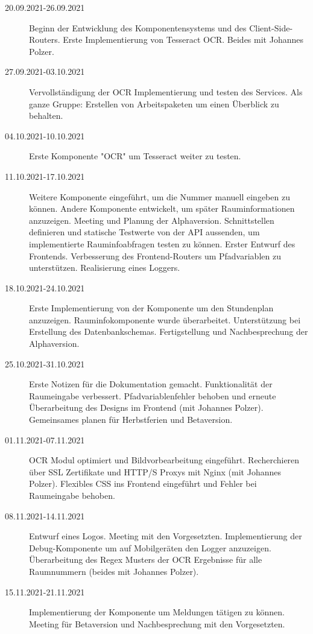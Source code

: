 
\begin{description}
    \item[20.09.2021-26.09.2021]Beginn der Entwicklung des Komponentensystems und des Client-Side-Routers. Erste Implementierung von Tesseract OCR. Beides mit Johannes Polzer.
    \item[27.09.2021-03.10.2021] Vervollständigung der OCR Implementierung und testen des Services. Als ganze Gruppe: Erstellen von Arbeitspaketen um einen Überblick zu behalten.
    \item[04.10.2021-10.10.2021] Erste Komponente "OCR" um Tesseract weiter zu testen.
    \item[11.10.2021-17.10.2021] Weitere Komponente eingeführt, um die Nummer manuell eingeben zu können. Andere Komponente entwickelt, um später Rauminformationen anzuzeigen. Meeting und Planung der Alphaversion. Schnittstellen definieren und statische Testwerte von der API aussenden, um implementierte Rauminfoabfragen testen zu können. Erster Entwurf des Frontends. Verbesserung des Frontend-Routers um Pfadvariablen zu unterstützen. Realisierung eines Loggers.
    \item[18.10.2021-24.10.2021] Erste Implementierung von der Komponente um den Stundenplan anzuzeigen. Rauminfokomponente wurde überarbeitet. Unterstützung bei Erstellung des Datenbankschemas. Fertigstellung und Nachbesprechung der Alphaversion.
    \item[25.10.2021-31.10.2021] Erste Notizen für die Dokumentation gemacht. Funktionalität der Raumeingabe verbessert. Pfadvariablenfehler behoben und erneute Überarbeitung des Designs im Frontend (mit Johannes Polzer). Gemeinsames planen für Herbstferien und Betaversion.
    \item[01.11.2021-07.11.2021] OCR Modul optimiert und Bildvorbearbeitung eingeführt. Recherchieren über SSL Zertifikate und HTTP/S Proxys mit Nginx (mit Johannes Polzer). Flexibles CSS ins Frontend eingeführt und Fehler bei Raumeingabe behoben.
    \item[08.11.2021-14.11.2021] Entwurf eines Logos. Meeting mit den Vorgesetzten. Implementierung der Debug-Komponente um auf Mobilgeräten den Logger anzuzeigen. Überarbeitung des Regex Musters der OCR Ergebnisse für alle Raumnummern (beides mit Johannes Polzer).
    \item[15.11.2021-21.11.2021] Implementierung der Komponente um Meldungen tätigen zu können. Meeting für Betaversion und Nachbesprechung mit den Vorgesetzten. 

\end{description}
